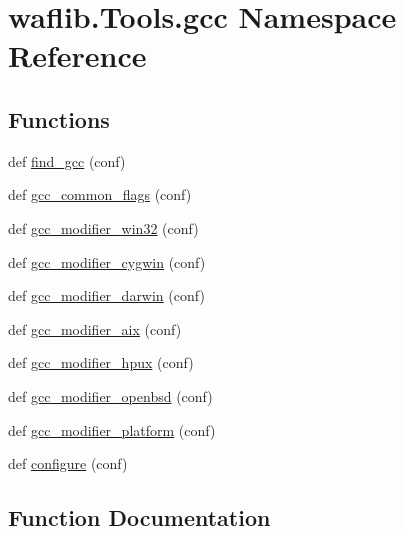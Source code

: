 \hypertarget{namespacewaflib_1_1_tools_1_1gcc}{}\section{waflib.\+Tools.\+gcc Namespace Reference}
\label{namespacewaflib_1_1_tools_1_1gcc}
\subsection*{Functions}
\begin{DoxyCompactItemize}
\item 
def \hyperlink{namespacewaflib_1_1_tools_1_1gcc_adf21017012efdee616642ded5bb60683}{find\+\_\+gcc} (conf)
\item 
def \hyperlink{namespacewaflib_1_1_tools_1_1gcc_aa246ce31be40dc13e4667dccc88c659c}{gcc\+\_\+common\+\_\+flags} (conf)
\item 
def \hyperlink{namespacewaflib_1_1_tools_1_1gcc_ae9e66bb9518233bc92bb4dba88559396}{gcc\+\_\+modifier\+\_\+win32} (conf)
\item 
def \hyperlink{namespacewaflib_1_1_tools_1_1gcc_a5a86b1286220845f0499fde5bfd3276d}{gcc\+\_\+modifier\+\_\+cygwin} (conf)
\item 
def \hyperlink{namespacewaflib_1_1_tools_1_1gcc_a1bd8f384e014d4230087830a15403045}{gcc\+\_\+modifier\+\_\+darwin} (conf)
\item 
def \hyperlink{namespacewaflib_1_1_tools_1_1gcc_aaa265ca0c341d3de2b08c63f42ae800b}{gcc\+\_\+modifier\+\_\+aix} (conf)
\item 
def \hyperlink{namespacewaflib_1_1_tools_1_1gcc_aa4d75e5242d8ccd3cf9953b2ac22b0c2}{gcc\+\_\+modifier\+\_\+hpux} (conf)
\item 
def \hyperlink{namespacewaflib_1_1_tools_1_1gcc_a8dadf5c5d5221a13562c2fa8dab9a5cc}{gcc\+\_\+modifier\+\_\+openbsd} (conf)
\item 
def \hyperlink{namespacewaflib_1_1_tools_1_1gcc_a8b495579108d27d3a2ba7efe6fb32489}{gcc\+\_\+modifier\+\_\+platform} (conf)
\item 
def \hyperlink{namespacewaflib_1_1_tools_1_1gcc_abbff880dc3450c1e8e3ecebbd8eebbad}{configure} (conf)
\end{DoxyCompactItemize}


\subsection{Function Documentation}
